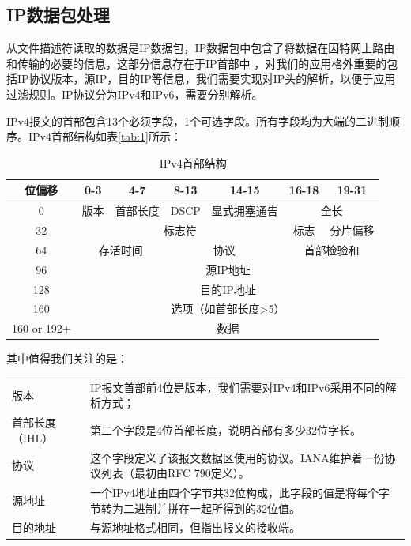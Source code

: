 \documentclass[format=final, language=chinese, degree=bachelor]{hustthesis}
\begin{document}
\subsection{IP数据包处理}


从文件描述符读取的数据是IP数据包，IP数据包中包含了将数据在因特网上路由和传输的必要的信息，这部分信息存在于IP首部中
，对我们的应用格外重要的包括IP协议版本，源IP，目的IP等信息，我们需要实现对IP头的解析，以便于应用过滤规则。IP协议分为IPv4和IPv6，需要分别解析。

IPv4报文的首部包含13个必须字段，1个可选字段。所有字段均为大端的二进制顺序。IPv4首部结构如表\autoref{tab:1}所示：

\begin{table}[h!]
\centering
\caption{IPv4首部结构}\label{tab:1}
\begin{tabular}{|c|c|c|c|c|c|c|}
	\hline
	位偏移 & 0-3 & 4-7 & 8-13 & 14-15 & 16-18 & 19-31\\
	\hline
	0 & 版本 & 首部长度 & DSCP & 显式拥塞通告 & \multicolumn{2}{c|}{全长}\\
	\hline
	32 & \multicolumn{4}{c|}{标志符} & 标志 & 分片偏移 \\
	\hline
	64 & \multicolumn{2}{c|}{存活时间}& \multicolumn{2}{c|}{协议}& \multicolumn{2}{c|}{首部检验和} \\
	\hline
	96 & \multicolumn{6}{c|}{源IP地址} \\
	\hline
	128 & \multicolumn{6}{c|}{目的IP地址} \\
	\hline
	160 & \multicolumn{6}{c|}{选项（如首部长度>5）} \\
	\hline
	160 or 192+ & \multicolumn{6}{c|}{数据}\\
	\hline
\end{tabular}
\end{table}


其中值得我们关注的是：
\begin{table}[h!]
\begin{tabular}{l l}
	版本 & IP报文首部前4位是版本，我们需要对IPv4和IPv6采用不同的解析方式；\\
	首部长度（IHL） & 第二个字段是4位首部长度，说明首部有多少32位字长。\\
	协议 & 这个字段定义了该报文数据区使用的协议。IANA维护着一份协议列表（最初由RFC 790定义）。\\
	源地址 & 一个IPv4地址由四个字节共32位构成，此字段的值是将每个字节转为二进制并拼在一起所得到的32位值。\\
	目的地址 & 与源地址格式相同，但指出报文的接收端。
\end{tabular}
\end{table}
\end{document}
